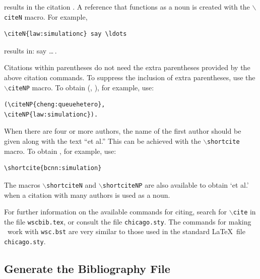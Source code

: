 \documentclass{wscpaperproc}
\theoremstyle{wsc}
\begin{document}
\noindent results in the citation \cite{law:simulationc,cheng:queuehetero}. A reference that functions as a noun is created with the {\tt $\backslash$citeN}
macro.  For example,\newline


\begin{verbatim}
\citeN{law:simulationc} say \ldots
\end{verbatim}\vspace{5mm}

\noindent results in:  say \ldots\,.

Citations within parentheses do not need the extra parentheses provided by the above citation commands.  To suppress the inclusion of extra parentheses, use the {\tt $\backslash$citeNP} macro.  To obtain (, ), for example, use:\newline


\begin{verbatim}
(\citeNP{cheng:queuehetero},
\citeNP{law:simulationc}).
\end{verbatim}\vspace{5mm}

When there are four or more authors, the name of the first author should be given along with the text ``et al.''  This can be achieved with the {\tt $\backslash$shortcite} macro. To obtain , for example, use: \newline


\begin{verbatim}
\shortcite{bcnn:simulation}
\end{verbatim}\vspace{5mm}

\noindent The macros {\tt $\backslash$shortciteN} and {\tt $\backslash$shortciteNP} are also available to obtain `et al.' when a citation with many authors is used as a noun.

For further information on the available commands for citing, search for {\tt $\backslash$cite} in the file {\tt wscbib.tex}, or consult the file {\tt chicago.sty}. The commands for making \BibTeX\ work with {\tt wsc.bst} are very similar to those used in the standard \LaTeX\ file {\tt chicago.sty}.

\subsection{Generate the Bibliography File}
\end{document}
